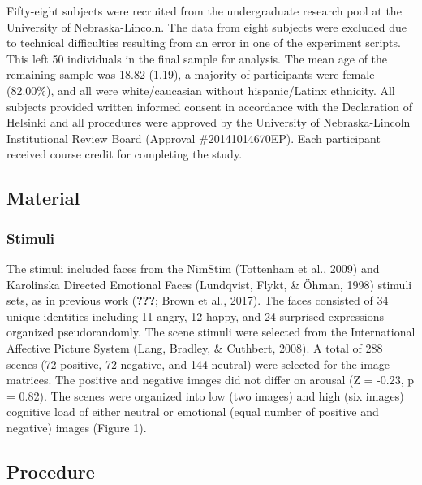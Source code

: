 \documentclass[man]{apa6}
\begin{document}
Fifty-eight subjects were recruited from the undergraduate research pool at the University of Nebraska-Lincoln. The data from eight subjects were excluded due to technical difficulties resulting from an error in one of the experiment scripts. This left 50 individuals in the final sample for analysis. The mean age of the remaining sample was 18.82 (1.19), a majority of participants were female (82.00\%), and all were white/caucasian without hispanic/Latinx ethnicity. All subjects provided written informed consent in accordance with the Declaration of Helsinki and all procedures were approved by the University of Nebraska-Lincoln Institutional Review Board (Approval \#20141014670EP). Each participant received course credit for completing the study.

\hypertarget{material}{%
\subsection{Material}\label{material}}

\hypertarget{stimuli}{%
\subsubsection{Stimuli}\label{stimuli}}

The stimuli included faces from the NimStim (Tottenham et al., 2009) and Karolinska Directed Emotional Faces (Lundqvist, Flykt, \& Öhman, 1998) stimuli sets, as in previous work ({\textbf{???}}; Brown et al., 2017). The faces consisted of 34 unique identities including 11 angry, 12 happy, and 24 surprised expressions organized pseudorandomly. The scene stimuli were selected from the International Affective Picture System (Lang, Bradley, \& Cuthbert, 2008). A total of 288 scenes (72 positive, 72 negative, and 144 neutral) were selected for the image matrices. The positive and negative images did not differ on arousal (Z = -0.23, p = 0.82). The scenes were organized into low (two images) and high (six images) cognitive load of either neutral or emotional (equal number of positive and negative) images (Figure 1).

\hypertarget{procedure}{%
\subsection{Procedure}\label{procedure}}
\end{document}

